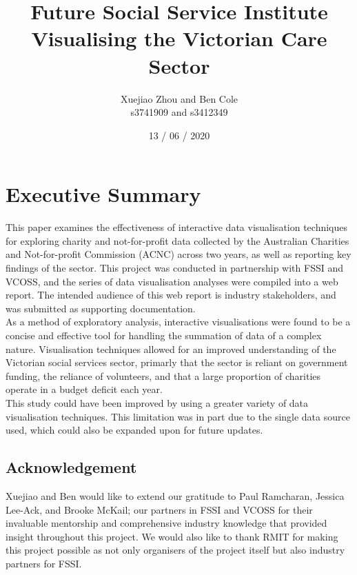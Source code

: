 \documentclass[
  11pt,
]{article}
\title{Future Social Service Institute\\
Visualising the Victorian Care Sector}
\author{Xuejiao Zhou and Ben Cole\\
s3741909 and s3412349}
\date{13 / 06 / 2020}
\begin{document}
\maketitle

{
\setcounter{tocdepth}{2}
\tableofcontents
}
\newpage
{}

\hypertarget{executive-summary}{%
\section*{Executive Summary}\label{executive-summary}}

This paper examines the effectiveness of interactive data visualisation techniques for exploring charity and not-for-profit data collected by the Australian Charities and Not-for-profit Commission (ACNC) across two years, as well as reporting key findings of the sector.
This project was conducted in partnership with FSSI and VCOSS, and the series of data visualisation analyses were compiled into a web report. The intended audience of this web report is industry stakeholders, and was submitted as supporting documentation.\\
As a method of exploratory analysis, interactive visualisations were found to be a concise and effective tool for handling the summation of data of a complex nature. Visualisation techniques allowed for an improved understanding of the Victorian social services sector, primarly that the sector is reliant on government funding, the reliance of volunteers, and that a large proportion of charities operate in a budget deficit each year.\\
This study could have been improved by using a greater variety of data visualisation techniques. This limitation was in part due to the single data source used, which could also be expanded upon for future updates.

\hypertarget{acknowledgement}{%
\subsection*{Acknowledgement}\label{acknowledgement}}

Xuejiao and Ben would like to extend our gratitude to Paul Ramcharan, Jessica Lee-Ack, and Brooke McKail; our partners in FSSI and VCOSS for their invaluable mentorship and comprehensive industry knowledge that provided insight throughout this project. We would also like to thank RMIT for making this project possible as not only organisers of the project itself but also industry partners for FSSI.
\end{document}
